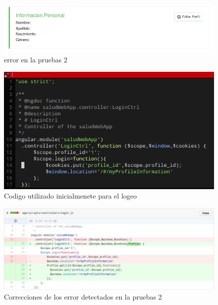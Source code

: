 \begin{figure}[h]
  \centering
  \includegraphics[width=.8\textwidth]{img/tp1_parte2/1-prueba_2}
  \caption{error en la pruebas 2}
  \label{prueba2}
\end{figure}

\begin{figure}[h]
  \centering
  \includegraphics[width=.8\textwidth]{img/tp1_parte2/1-codigo_prueba_2}
  \caption{Codigo utilizado inicialmenete para el logeo}
  \label{Codigoinicialprueba2}
\end{figure}


\begin{figure}[h]
  \centering
  \includegraphics[width=.8\textwidth]{img/tp1_parte2/1-correccion_prueba_2}
  \caption{Correcciones de los error detectados en la pruebas 2}
  \label{correccionprueba2}
\end{figure}

\clearpage


